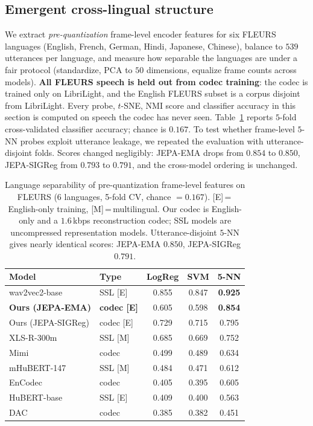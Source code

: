 \documentclass[conference,a4paper]{APSIPA2026}
\begin{document}
\subsection{Emergent cross-lingual structure}
\label{sec:crosslingual}

We extract \emph{pre-quantization} frame-level encoder features for six FLEURS
languages (English, French, German, Hindi, Japanese, Chinese), balance to
$539$ utterances per language, and measure how separable the languages are
under a fair protocol (standardize, PCA to $50$ dimensions, equalize frame
counts across models).
\textbf{All FLEURS speech is held out from codec training}: the codec is
trained only on LibriLight, and the English FLEURS subset is a corpus disjoint
from LibriLight. Every probe, $t$-SNE, NMI score and classifier accuracy in
this section is computed on speech the codec has never seen.
Table~\ref{tab:crosslingual} reports $5$-fold cross-validated classifier
accuracy; chance is $0.167$. To test whether frame-level $5$-NN probes exploit
utterance leakage, we repeated the evaluation with utterance-disjoint folds.
Scores changed negligibly: JEPA-EMA drops from $0.854$ to $0.850$, JEPA-SIGReg
from $0.793$ to $0.791$, and the cross-model ordering is unchanged.

\begin{table}[t]
\caption{Language separability of pre-quantization frame-level features on
FLEURS (6 languages, 5-fold CV, chance $=0.167$). [E]\,=\,English-only training,
[M]\,=\,multilingual. Our codec is English-only and a $1.6$\,kbps reconstruction
codec; SSL models are uncompressed representation models. Utterance-disjoint
$5$-NN gives nearly identical scores: JEPA-EMA $0.850$, JEPA-SIGReg $0.791$.}
\label{tab:crosslingual}
\centering
\begin{tabular}{llccc}
\toprule
Model & Type & LogReg & SVM & 5-NN \\
\midrule
wav2vec2-base       & SSL [E]    & 0.855 & 0.847 & \textbf{0.925} \\
\textbf{Ours (JEPA-EMA)} & \textbf{codec [E]} & 0.605 & 0.598 & \textbf{0.854} \\
Ours (JEPA-SIGReg)  & codec [E]  & 0.729 & 0.715 & 0.795 \\
XLS-R-300m          & SSL [M]    & 0.685 & 0.669 & 0.752 \\
Mimi                & codec      & 0.499 & 0.489 & 0.634 \\
mHuBERT-147         & SSL [M]    & 0.484 & 0.471 & 0.612 \\
EnCodec             & codec      & 0.405 & 0.395 & 0.605 \\
HuBERT-base         & SSL [E]    & 0.409 & 0.400 & 0.563 \\
DAC                 & codec      & 0.385 & 0.382 & 0.451 \\
\bottomrule
\end{tabular}
\end{table}
\end{document}
